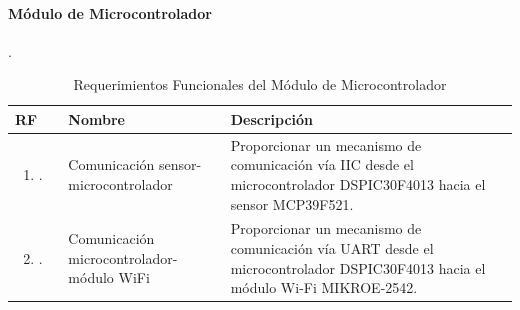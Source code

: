 \paragraph{Módulo de Microcontrolador}.
\begin{longtable}{|M{1.6cm}|M{4.0cm}|M{6.0cm}|}
    \caption{Requerimientos Funcionales del Módulo de Microcontrolador}
	\hline
	\textbf{RF} & \textbf{Nombre} & \textbf{Descripción} \\ 
	\hline
 	\begin{enumerate}[label=RF\arabic*]
 	    \item.
 	\end{enumerate}
 	& Comunicación sensor-microcontrolador
 	& Proporcionar un mecanismo de comunicación vía IIC desde el microcontrolador DSPIC30F4013 hacia el sensor MCP39F521. \\
    \hline
    \begin{enumerate}[label=RF\arabic*]
        \setcounter{enumi}{1}
 	    \item.
 	\end{enumerate}
 	& Comunicación microcontrolador-módulo WiFi
 	& Proporcionar un mecanismo de comunicación vía UART desde el microcontrolador DSPIC30F4013 hacia el módulo Wi-Fi MIKROE-2542. \\
    \hline
\end{longtable}



